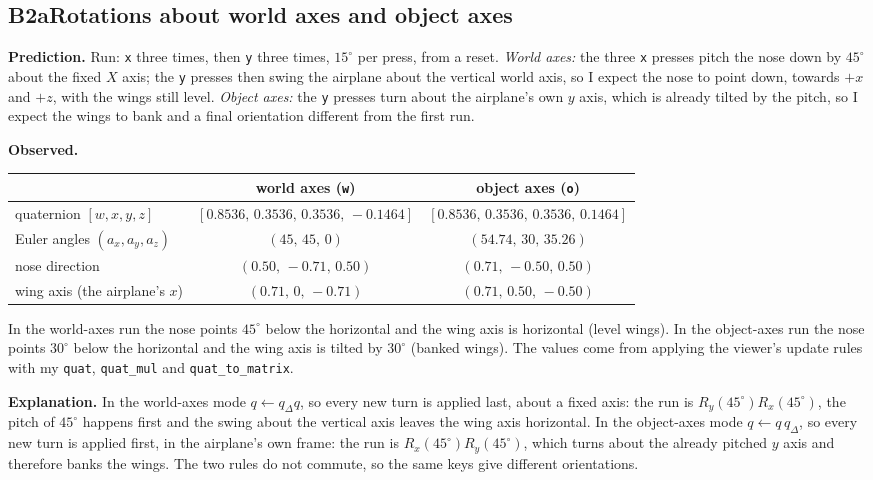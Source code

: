 \documentclass[10pt,a4paper]{article}
\newcommand{\experiment}[5]{%
  \subsection*{#1\quad #2}
  \textbf{Prediction.} #3\par
  \textbf{Observed.} #4\par
  \textbf{Explanation.} #5\par
}
\begin{document}
\experiment{B2a}{Rotations about world axes and object axes}
  {Run: \texttt{x} three times, then \texttt{y} three times, $15^\circ$ per press, from a reset.
   \emph{World axes:} the three \texttt{x} presses pitch the nose down by $45^\circ$ about the fixed $X$ axis; the
   \texttt{y} presses then swing the airplane about the vertical world axis, so I expect the nose to point down,
   towards $+x$ and $+z$, with the wings still level. \emph{Object axes:} the \texttt{y} presses turn about the
   airplane's own $y$ axis, which is already tilted by the pitch, so I expect the wings to bank and a final
   orientation different from the first run.}
  {\begin{center}\small
   \begin{tabular}{lcc}\toprule
     & world axes (\texttt{w}) & object axes (\texttt{o})\\\midrule
     quaternion $[w,x,y,z]$ & $[0.8536,\,0.3536,\,0.3536,\,-0.1464]$ & $[0.8536,\,0.3536,\,0.3536,\,0.1464]$\\
     Euler angles $(a_x,a_y,a_z)$ & $(45,\,45,\,0)$ & $(54.74,\,30,\,35.26)$\\
     nose direction & $(0.50,\,-0.71,\,0.50)$ & $(0.71,\,-0.50,\,0.50)$\\
     wing axis (the airplane's $x$) & $(0.71,\,0,\,-0.71)$ & $(0.71,\,0.50,\,-0.50)$\\\bottomrule
   \end{tabular}\end{center}
   In the world-axes run the nose points $45^\circ$ below the horizontal and the wing axis is horizontal (level
   wings). In the object-axes run the nose points $30^\circ$ below the horizontal and the wing axis is tilted by
   $30^\circ$ (banked wings). The values come from applying the viewer's update rules with my \texttt{quat},
   \texttt{quat\_mul} and \texttt{quat\_to\_matrix}.}
  {In the world-axes mode $q\leftarrow q_\Delta q$, so every new turn is applied last, about a fixed axis: the
   run is $R_y(45^\circ)R_x(45^\circ)$, the pitch of $45^\circ$ happens first and the swing about the vertical axis
   leaves the wing axis horizontal. In the object-axes mode $q\leftarrow q\,q_\Delta$, so every new turn is applied
   first, in the airplane's own frame: the run is $R_x(45^\circ)R_y(45^\circ)$, which turns about the already pitched
   $y$ axis and therefore banks the wings. The two rules do not commute, so the same keys give different
   orientations.}
\end{document}
